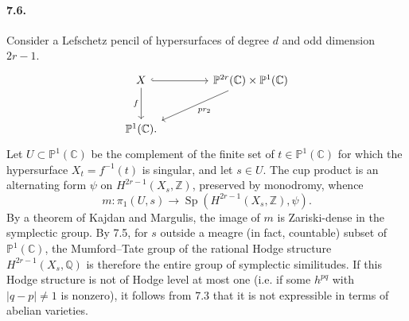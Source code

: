 \documentclass[10pt,leqno]{article}
\newcommand{\C}{\mathbb{C}}
\newcommand{\Q}{\mathbb{Q}}
\newcommand{\Z}{\mathbb{Z}}
\begin{document}
\paragraph{7.6.} Consider a Lefschetz pencil of hypersurfaces of degree $d$ and odd dimension $2r-1$.
\[
\begin{tikzcd}[column sep=4.2em,row sep=2.6em]
X \arrow[r,hook] \arrow[d,"f"'] & \mathbb P^{2r}(\C)\times\mathbb P^1(\C) \arrow[dl,"pr_2"]\\
\mathbb P^1(\C). &
\end{tikzcd}
\]
Let $U\subset\mathbb P^1(\C)$ be the complement of the finite set of $t\in\mathbb P^1(\C)$ for which the hypersurface $X_t=f^{-1}(t)$ is singular, and let $s\in U$. The cup product is an alternating form $\psi$ on $H^{2r-1}(X_s,\Z)$, preserved by monodromy, whence
\[
m:\pi_1(U,s)\longrightarrow \operatorname{Sp}(H^{2r-1}(X_s,\Z),\psi).
\]
By a theorem of Kajdan and Margulis, the image of $m$ is Zariski-dense in the symplectic group. By 7.5, for $s$ outside a meagre (in fact, countable) subset of $\mathbb P^1(\C)$, the Mumford--Tate group of the rational Hodge structure $H^{2r-1}(X_s,\Q)$ is therefore the entire group of symplectic similitudes. If this Hodge structure is not of Hodge level at most one (i.e. if some $h^{pq}$ with $|q-p|\ne1$ is nonzero), it follows from 7.3 that it is not expressible in terms of abelian varieties.

\clearpage
\end{document}
